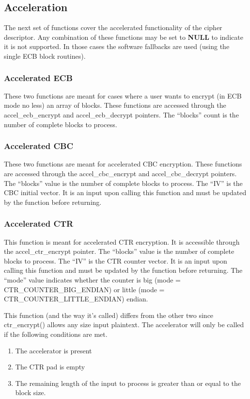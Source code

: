 \documentclass[a4paper]{book}
\begin{document}
\subsection{Acceleration}
The next set of functions cover the accelerated functionality of the cipher descriptor.  Any combination of these functions may be set to \textbf{NULL} to indicate
it is not supported.  In those cases the software fallbacks are used (using the single ECB block routines).

\subsubsection{Accelerated ECB}
These two functions are meant for cases where a user wants to encrypt (in ECB mode no less) an array of blocks.  These functions are accessed
through the accel\_ecb\_encrypt and accel\_ecb\_decrypt pointers.  The ``blocks'' count is the number of complete blocks to process.

\subsubsection{Accelerated CBC} 
These two functions are meant for accelerated CBC encryption.  These functions are accessed through the accel\_cbc\_encrypt and accel\_cbc\_decrypt pointers.
The ``blocks'' value is the number of complete blocks to process.  The ``IV'' is the CBC initial vector.  It is an input upon calling this function and must be
updated by the function before returning.  

\subsubsection{Accelerated CTR}
This function is meant for accelerated CTR encryption.  It is accessible through the accel\_ctr\_encrypt pointer.
The ``blocks'' value is the number of complete blocks to process.  The ``IV'' is the CTR counter vector.  It is an input upon calling this function and must be
updated by the function before returning.  The ``mode'' value indicates whether the counter is big (mode = CTR\_COUNTER\_BIG\_ENDIAN) or 
little (mode = CTR\_COUNTER\_LITTLE\_ENDIAN) endian.

This function (and the way it's called) differs from the other two since ctr\_encrypt() allows any size input plaintext.  The accelerator will only be
called if the following conditions are met.

\begin{enumerate}
   \item The accelerator is present
   \item The CTR pad is empty
   \item The remaining length of the input to process is greater than or equal to the block size.
\end{enumerate}
\end{document}
